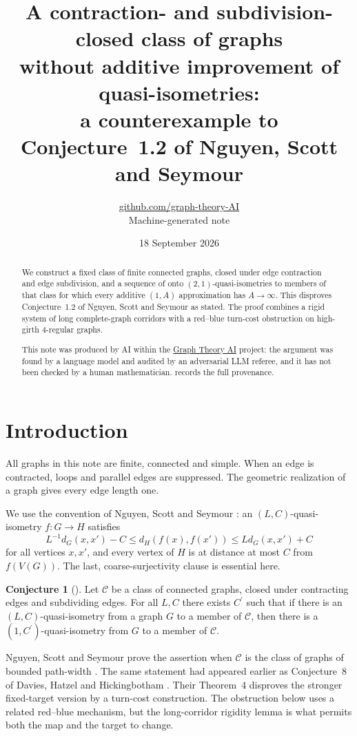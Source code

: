 \documentclass[11pt,a4paper]{article}
\title{A contraction- and subdivision-closed class of graphs\\ without additive improvement of quasi-isometries:\\ a counterexample to Conjecture~1.2 of Nguyen, Scott and Seymour}
\author{\href{https://github.com/graph-theory-AI}{github.com/graph-theory-AI}\\[2pt] \normalsize Machine-generated note}
\date{18 September 2026}
\theoremstyle{plain}
\theoremstyle{definition}
\newtheorem{conjecture}[theorem]{Conjecture}
\theoremstyle{remark}
\newcommand{\cC}{\mathcal C}
\begin{document}
\maketitle

\begin{abstract}
We construct a fixed class of finite connected graphs, closed under edge contraction and edge subdivision, and a sequence of onto $(2,1)$-quasi-isometries to members of that class for which every additive $(1,A)$ approximation has $A\to\infty$. This disproves Conjecture~1.2 of Nguyen, Scott and Seymour as stated. The proof combines a rigid system of long complete-graph corridors with a red--blue turn-cost obstruction on high-girth $4$-regular graphs.

\medskip\noindent\small
This note was produced by AI within the \href{https://github.com/graph-theory-AI/Graph-Theory-LLM-Proofs}{Graph Theory AI} project: the argument was found by a language model and audited by an adversarial LLM referee, and it has not been checked by a human mathematician.  records the full provenance.
\end{abstract}

\section{Introduction}\label{sec:intro}

All graphs in this note are finite, connected and simple. When an edge is contracted, loops and parallel edges are suppressed. The geometric realization of a graph gives every edge length one.

We use the convention of Nguyen, Scott and Seymour \cite{NSS25}: an $(L,C)$-quasi-isometry $f\colon G\to H$ satisfies
\[
 L^{-1}d_G(x,x')-C\le d_H(f(x),f(x'))\le Ld_G(x,x')+C
\]
for all vertices $x,x'$, and every vertex of $H$ is at distance at most $C$ from $f(V(G))$. The last, coarse-surjectivity clause is essential here.

\begin{conjecture}[{\cite[Conjecture~1.2]{NSS25}}]\label{conj:nss}
Let $\mathcal{C}$ be a class of connected graphs, closed under contracting edges and subdividing edges. For all $L,C$ there exists $C^{\prime}$ such that if there is an $(L,C)$-quasi-isometry from a graph $G$ to a member of $\mathcal{C}$, then there is a $(1,C^{\prime})$-quasi-isometry from $G$ to a member of $\mathcal{C}$.
\end{conjecture}

Nguyen, Scott and Seymour prove the assertion when $\cC$ is the class of graphs of bounded path-width \cite[Theorem~1.3]{NSS25}. The same statement had appeared earlier as Conjecture~8 of Davies, Hatzel and Hickingbotham \cite{DHH25}. Their Theorem~4 disproves the stronger fixed-target version by a turn-cost construction. The obstruction below uses a related red--blue mechanism, but the long-corridor rigidity lemma is what permits both the map and the target to change.
\end{document}
